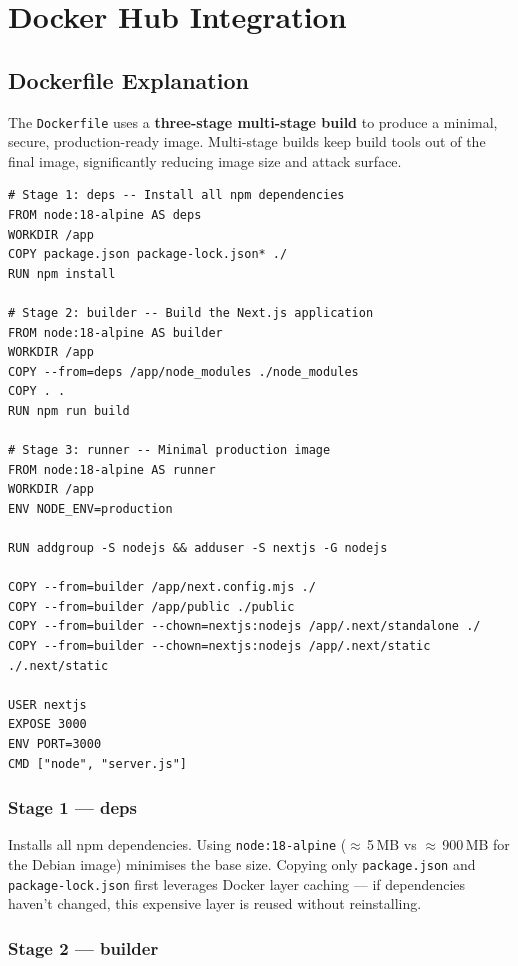 \documentclass[12pt,a4paper,oneside]{report}
\begin{document}
\chapter{Docker Hub Integration}

\section{Dockerfile Explanation}

The \texttt{Dockerfile} uses a \textbf{three-stage multi-stage build} to produce a
minimal, secure, production-ready image. Multi-stage builds keep build tools out of
the final image, significantly reducing image size and attack surface.

\begin{lstlisting}
# Stage 1: deps -- Install all npm dependencies
FROM node:18-alpine AS deps
WORKDIR /app
COPY package.json package-lock.json* ./
RUN npm install

# Stage 2: builder -- Build the Next.js application
FROM node:18-alpine AS builder
WORKDIR /app
COPY --from=deps /app/node_modules ./node_modules
COPY . .
RUN npm run build

# Stage 3: runner -- Minimal production image
FROM node:18-alpine AS runner
WORKDIR /app
ENV NODE_ENV=production

RUN addgroup -S nodejs && adduser -S nextjs -G nodejs

COPY --from=builder /app/next.config.mjs ./
COPY --from=builder /app/public ./public
COPY --from=builder --chown=nextjs:nodejs /app/.next/standalone ./
COPY --from=builder --chown=nextjs:nodejs /app/.next/static ./.next/static

USER nextjs
EXPOSE 3000
ENV PORT=3000
CMD ["node", "server.js"]
\end{lstlisting}

\subsection{Stage 1 --- deps}

Installs all npm dependencies. Using \texttt{node:18-alpine}
($\approx$\,5\,MB vs $\approx$\,900\,MB for the Debian image) minimises the base
size. Copying only \texttt{package.json} and \texttt{package-lock.json} first
leverages Docker layer caching --- if dependencies haven't changed, this expensive
layer is reused without reinstalling.

\subsection{Stage 2 --- builder}
\end{document}
